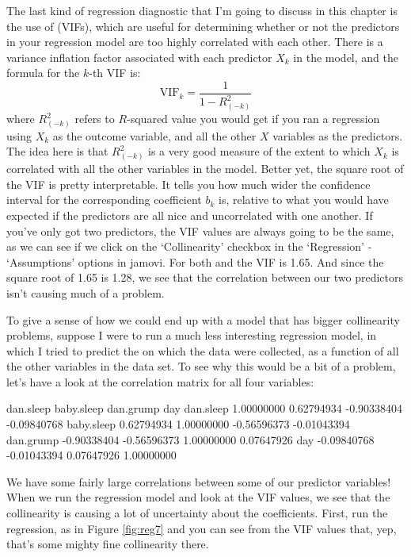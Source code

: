 
The last kind of regression diagnostic that I'm going to discuss in this chapter is the use of  (VIFs), which are useful for determining whether or not the predictors in your regression model are too highly correlated with each other. There is a variance inflation factor associated with each predictor $X_k$ in the model, and the formula for the $k$-th VIF is:
$$
\mbox{VIF}_k = \frac{1}{1-{R^2_{(-k)}}}
$$
where $R^2_{(-k)}$ refers to $R$-squared value you would get if you ran a regression using $X_k$ as the outcome variable, and all the other $X$ variables as the predictors. The idea here is that $R^2_{(-k)}$ is a very good measure of the extent to which $X_k$ is correlated with all the other variables in the model. Better yet, the square root of the VIF is pretty interpretable. It tells you how much wider the confidence interval for the corresponding coefficient $b_k$ is, relative to what you would have expected if the predictors are all nice and uncorrelated with one another. If you've only got two predictors, the VIF values are always going to be the same, as we can see if we click on the `Collinearity' checkbox in the `Regression' - `Assumptions' options in jamovi. For both  and  the VIF is 1.65. And since the square root of 1.65 is 1.28, we see that the correlation between our two predictors isn't causing much of a problem. 

To give a sense of how we could end up with a model that has bigger collinearity problems, suppose I were to run a much less interesting regression model, in which I tried to predict the  on which the data were collected, as a function of all the other variables in the data set. To see why this would be a bit of a problem, let's have a look at the correlation matrix for all four variables:

\begin{rblock1}
             dan.sleep  baby.sleep   dan.grump         day
dan.sleep   1.00000000  0.62794934 -0.90338404 -0.09840768
baby.sleep  0.62794934  1.00000000 -0.56596373 -0.01043394
dan.grump  -0.90338404 -0.56596373  1.00000000  0.07647926
day        -0.09840768 -0.01043394  0.07647926  1.00000000
\end{rblock1}

We have some fairly large correlations between some of our predictor variables! When we run the regression model and look at the VIF values, we see that the collinearity is causing a lot of uncertainty about the coefficients. First, run the regression, as in Figure \ref{fig:reg7}  and you can see from the VIF values that, yep, that's some mighty fine collinearity there.

